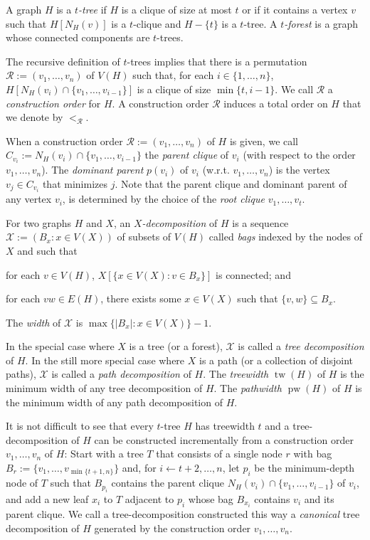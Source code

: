 \documentclass[kpfonts]{patmorin}
\DeclareMathOperator{\tw}{tw}
\DeclareMathOperator{\pw}{pw}
\theoremstyle{named}
\begin{document}
A graph $H$ is a \emph{$t$-tree} if $H$ is a clique of size at most $t$ or if it contains a vertex $v$ such that $H[N_H(v)]$ is a $t$-clique and $H-\{t\}$ is a $t$-tree.  A \emph{$t$-forest} is a graph whose connected components are $t$-trees.

The recursive definition of $t$-trees implies that there is a permutation $\mathcal{R}:=(v_1,\ldots,v_n)$ of $V(H)$ such that, for each $i\in\{1,\ldots,n\}$, $H[N_H(v_i)\cap \{v_1,\ldots,v_{i-1}\}]$ is a clique of size $\min\{t,i-1\}$.  We call $\mathcal{R}$ a \emph{construction order} for $H$.  A construction order $\mathcal{R}$ induces a total order on $H$ that we denote by $<_{\mathcal{R}}$.

When a construction order $\mathcal{R}:=(v_1,\ldots,v_n)$ of $H$ is given, we call $C_{v_i}:=N_H(v_i)\cap \{v_1,\ldots,v_{i-1}\}$ the \emph{parent clique} of $v_i$ (with respect to the order $v_1,\ldots,v_n$).  The \emph{dominant parent} $p(v_i)$ of $v_i$ (w.r.t. $v_1,\ldots,v_n$) is the vertex $v_j\in C_{v_i}$ that minimizes $j$. Note that the parent clique and dominant parent of any vertex $v_i$, is determined by the choice of the \emph{root clique} $v_1,\ldots,v_{t}$.

For two graphs $H$ and $X$, an \emph{$X$-decomposition} of $H$ is a sequence $\mathcal{X}:=(B_x:x\in V(X))$ of subsets of $V(H)$ called \emph{bags} indexed by the nodes of $X$ and such that
 \begin{inparaenum}[(i)]
     \item for each $v\in V(H)$, $X[\{x\in V(X):v\in B_x\}]$ is connected; and
     \item for each $vw\in E(H)$, there exists some $x\in V(X)$ such that $\{v,w\}\subseteq B_x$.
\end{inparaenum}
The \emph{width} of $\mathcal{X}$ is $\max\{|B_x|:x\in V(X)\}-1$.

In the special case where $X$ is a tree (or a forest), $\mathcal{X}$ is called a \emph{tree decomposition} of $H$.  In the still more special case where $X$ is a path (or a collection of disjoint paths), $\mathcal{X}$ is called a \emph{path decomposition} of $H$. The \emph{treewidth} $\tw(H)$ of $H$ is the minimum width of any tree decomposition of $H$. The \emph{pathwidth} $\pw(H)$ of $H$ is the minimum width of any path decomposition of $H$.

It is not difficult to see that every $t$-tree $H$ has treewidth $t$ and a tree-decomposition of $H$ can be constructed incrementally from a construction order $v_1,\ldots,v_n$ of $H$: Start with a tree $T$ that consists of a single node $r$ with bag $B_r:=\{v_1,\ldots,v_{\min\{t+1,n\}}\}$ and, for $i\gets t+2,\ldots,n$, let $p_i$ be the minimum-depth node of $T$ such that $B_{p_i}$ contains the parent clique $N_H(v_i)\cap\{v_1,\ldots,v_{i-1}\}$ of $v_i$, and add a new leaf $x_i$ to $T$ adjacent to $p_i$ whose bag $B_{x_i}$ contains $v_i$ and its parent clique.  We call a tree-decomposition constructed this way a \emph{canonical} tree decomposition of $H$ generated by the construction order $v_1,\ldots,v_n$.
\end{document}
